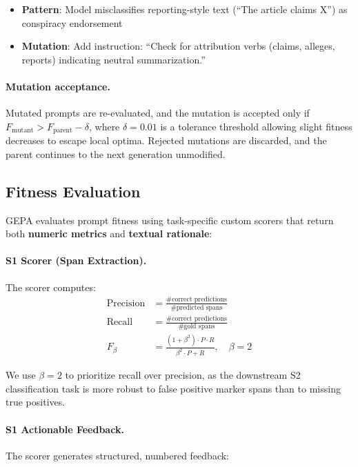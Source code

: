 \documentclass[11pt]{article}
\begin{document}
\begin{itemize}[noitemsep]
	\item \textbf{Pattern}: Model misclassifies reporting-style text (``The article claims X'') as conspiracy endorsement
	\item \textbf{Mutation}: Add instruction: ``Check for attribution verbs (claims, alleges, reports) indicating neutral summarization.''
\end{itemize}

\paragraph{Mutation acceptance.} Mutated prompts are re-evaluated, and the mutation is accepted only if
$F_{\text{mutant}} > F_{\text{parent}} - \delta$, where $\delta = 0.01$ is a
tolerance threshold allowing slight fitness decreases to escape local optima.
Rejected mutations are discarded, and the parent continues to the next
generation unmodified.

\subsection{Fitness Evaluation}
\label{sec:gepa-fitness}

GEPA evaluates prompt fitness using task-specific custom scorers that return
both \textbf{numeric metrics} and \textbf{textual rationale}:

\paragraph{S1 Scorer (Span Extraction).} The scorer computes:
\begin{align*}
	\text{Precision} & = \frac{\text{\# correct predictions}}{\text{\# predicted spans}}            \\
	\text{Recall}    & = \frac{\text{\# correct predictions}}{\text{\# gold spans}}                 \\
	F_\beta          & = \frac{(1 + \beta^2) \cdot P \cdot R}{\beta^2 \cdot P + R}, \quad \beta = 2
\end{align*}

We use $\beta = 2$ to prioritize recall over precision, as the downstream S2
classification task is more robust to false positive marker spans than to
missing true positives.

\paragraph{S1 Actionable Feedback.} The scorer generates structured, numbered feedback:
\end{document}
